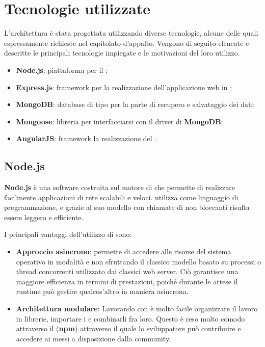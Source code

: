 \section{Tecnologie utilizzate}


L'architettura è stata progettata utilizzando diverse tecnologie, alcune delle quali espressamente richieste nel capitolato d'appalto. Vengono di seguito elencate e descritte le principali tecnologie impiegate e le motivazioni del loro utilizzo.

\begin{itemize}
	\item \textbf{Node.js}: piattaforma per il ;
	\item \textbf{Express.js}: framework per la realizzazione dell’applicazione web in ;
	\item \textbf{MongoDB}: database di tipo  per la parte di recupero e salvataggio dei dati;
	\item \textbf{Mongoose}: libreria per interfacciarsi con il driver di \textbf{MongoDB};
	\item \textbf{AngularJS}: framework  la realizzazione del .
\end{itemize}

\subsection{Node.js}
\textbf{Node.js} è una  software costruita sul motore  di  che permette di realizzare facilmente applicazioni di rete scalabili e veloci.  utilizza  come linguaggio di programmazione, e grazie al suo modello  con chiamate di  non bloccanti risulta essere leggero e efficiente.

I principali vantaggi dell'utilizzo di  sono:
\begin{itemize}
	\item \textbf{Approccio asincrono}:  permette di accedere alle risorse del sistema operativo in modalità  e non sfruttando il classico modello basato su processi o thread concorrenti utilizzato dai classici web server. Ciò garantisce una maggiore efficienza in termini di prestazioni, poiché durante le attese il runtime può gestire qualcos'altro in maniera asincrona.
	\item \textbf{Architettura modulare}: Lavorando con  è molto facile organizzare il lavoro in librerie, importare i  e combinarli fra loro. Questo è reso molto comodo attraverso il  (\textbf{npm}) attraverso il quale lo sviluppatore può contribuire e accedere ai  messi a disposizione dalla community.
\end{itemize}

